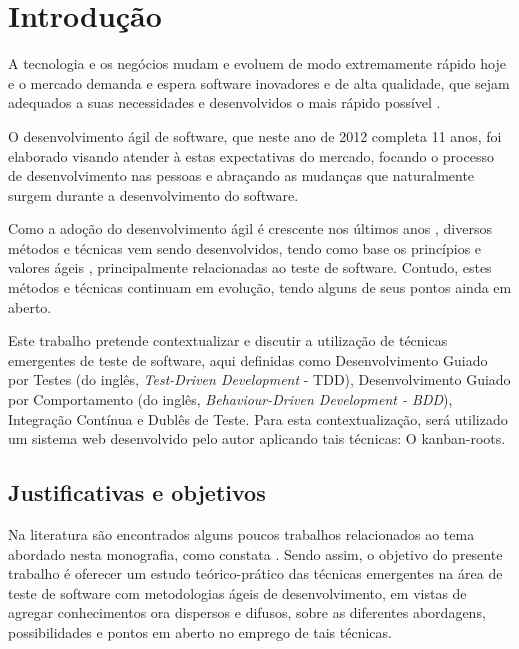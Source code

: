 \chapter{Introdução}

A tecnologia e os negócios mudam e evoluem de modo extremamente rápido hoje e o mercado demanda e espera software inovadores e de alta qualidade, que sejam adequados a suas necessidades e desenvolvidos o mais rápido possível \cite{TheBusinessOfInnovation}.

O desenvolvimento ágil de software, que neste ano de 2012 completa 11 anos, foi elaborado \cite{AgileManifesto} visando atender à estas expectativas do mercado, focando o processo de desenvolvimento nas pessoas e abraçando as mudanças que naturalmente surgem durante a desenvolvimento do software.

Como a adoção do desenvolvimento ágil é crescente nos últimos anos \cite{ResumoChaosReport}, diversos métodos e técnicas vem sendo desenvolvidos, tendo como base os princípios e valores ágeis \cite{BDDRodrigo}, principalmente relacionadas ao teste de software. Contudo, estes métodos e técnicas continuam em evolução, tendo alguns de seus pontos ainda em aberto.

Este trabalho pretende contextualizar e discutir a utilização de técnicas emergentes de teste de software, aqui definidas como Desenvolvimento Guiado por Testes (do inglês, \textit{Test-Driven Development} - TDD), Desenvolvimento Guiado por Comportamento (do inglês, \textit{Behaviour-Driven Development - BDD}), Integração Contínua e Dublês de Teste. Para esta contextualização, será utilizado um sistema web desenvolvido pelo autor aplicando tais técnicas: O kanban-roots.

\section{Justificativas e objetivos}

Na literatura são encontrados alguns poucos trabalhos relacionados ao tema abordado nesta monografia, como constata . Sendo assim, o objetivo do presente trabalho é oferecer um estudo teórico-prático das técnicas emergentes na área de teste de software com metodologias ágeis de desenvolvimento, em vistas de agregar conhecimentos ora dispersos e difusos, sobre as diferentes abordagens, possibilidades e pontos em aberto no emprego de tais técnicas.

